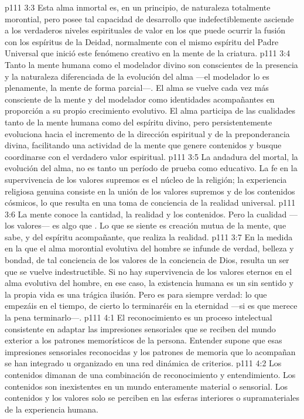 \vs p111 3:3 Esta alma inmortal es, en un principio, de naturaleza totalmente morontial, pero posee tal capacidad de desarrollo que indefectiblemente asciende a los verdaderos niveles espirituales de valor en los que puede ocurrir la fusión con los espíritus de la Deidad, normalmente con el mismo espíritu del Padre Universal que inició este fenómeno creativo en la mente de la criatura.
\vs p111 3:4 Tanto la mente humana como el modelador divino son conscientes de la presencia y la naturaleza diferenciada de la evolución del alma ---el modelador lo es plenamente, la mente de forma parcial---. El alma se vuelve cada vez más consciente de la mente y del modelador como identidades acompañantes en proporción a su propio crecimiento evolutivo. El alma participa de las cualidades tanto de la mente humana como del espíritu divino, pero persistentemente evoluciona hacia el incremento de la dirección espiritual y de la preponderancia divina, facilitando una actividad de la mente que genere contenidos y busque coordinarse con el verdadero valor espiritual.
\vs p111 3:5 La andadura del mortal, la evolución del alma, no es tanto un período de prueba como educativo. La fe en la supervivencia de los valores supremos es el núcleo de la religión; la experiencia religiosa genuina consiste en la unión de los valores supremos y de los contenidos cósmicos, lo que resulta en una toma de conciencia de la realidad universal.
\vs p111 3:6 La mente conoce la cantidad, la realidad y los contenidos. Pero la cualidad ---los valores--- es algo que . Lo que se siente es creación mutua de la mente, que sabe, y del espíritu acompañante, que realiza la realidad.
\vs p111 3:7 En la medida en la que el alma morontial evolutiva del hombre se infunde de verdad, belleza y bondad, de tal conciencia de los valores de la conciencia de Dios, resulta un ser que se vuelve indestructible. Si no hay supervivencia de los valores eternos en el alma evolutiva del hombre, en ese caso, la existencia humana es un sin sentido y la propia vida es una trágica ilusión. Pero es para siempre verdad: lo que empezáis en el tiempo, de cierto lo terminaréis en la eternidad ---si es que merece la pena terminarlo---.
\vs p111 4:1 El reconocimiento es un proceso intelectual consistente en adaptar las impresiones sensoriales que se reciben del mundo exterior a los patrones memorísticos de la persona. Entender supone que esas impresiones sensoriales reconocidas y los patrones de memoria que lo acompañan se han integrado u organizado en una red dinámica de criterios.
\vs p111 4:2 Los contenidos dimanan de una combinación de reconocimiento y entendimiento. Los contenidos son inexistentes en un mundo enteramente material o sensorial. Los contenidos y los valores solo se perciben en las esferas interiores o supramateriales de la experiencia humana.
